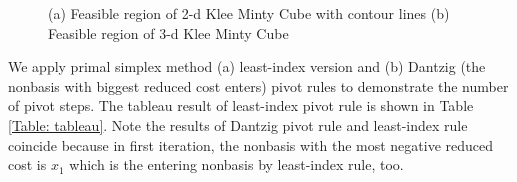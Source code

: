 \documentclass[11pt]{article}
\begin{document}
\begin{figure}
    \centering
    \caption{(a) Feasible region of 2-d Klee Minty Cube with contour lines (b) Feasible region of 3-d Klee Minty Cube}
    \label{fig:kmcube}
\end{figure}
We apply primal simplex method (a) least-index version and (b) Dantzig (the nonbasis with biggest reduced cost enters) pivot rules to demonstrate the number of pivot steps. The tableau result of least-index pivot rule is shown in Table \ref{Table: tableau}. Note the results of Dantzig pivot rule and least-index rule coincide because in first iteration, the nonbasis with the most negative reduced cost is $x_1$ which is the entering nonbasis by least-index rule, too. 
\end{document}

